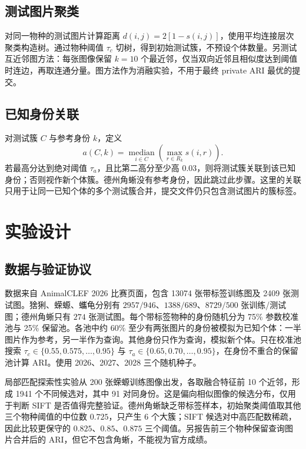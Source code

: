 \documentclass[UTF8,a4paper,10pt]{ctexart}
\begin{document}
\subsection{测试图片聚类}
对同一物种的测试图片计算距离 $d(i,j)=2[1-s(i,j)]$，使用平均连接层次聚类构造树。通过物种阈值 $\tau_c$ 切树，得到初始测试簇，不预设个体数量。另测试互近邻图方法：每张图像保留 $k=10$ 个最近邻，仅当双向近邻且相似度达到阈值时连边，再取连通分量。图方法作为消融实验，不用于最终 private ARI 最优的提交。

\subsection{已知身份关联}
对测试簇 $C$ 与参考身份 $k$，定义
\begin{equation}
 a(C,k)=\underset{i\in C}{\operatorname{median}}
 \left(\max_{r\in R_k}s(i,r)\right).
\end{equation}
若最高分达到绝对阈值 $\tau_a$，且比第二高分至少高 $0.03$，则将测试簇关联到该已知身份；否则视作新个体簇。德州角蜥没有参考身份，因此跳过此步骤。这里的关联只用于让同一已知个体的多个测试簇合并，提交文件仍只包含测试图片的簇标签。

\section{实验设计}
\subsection{数据与验证协议}
数据来自 AnimalCLEF 2026 比赛页面\cite{competition}，包含 13074 张带标签训练图及 2409 张测试图。猞猁、蝾螈、蠵龟分别有 $2957/946$、$1388/689$、$8729/500$ 张训练/测试图；德州角蜥只有 $274$ 张测试图。每个带标签物种的身份随机分为 75\% 参数校准池与 25\% 保留池。各池中约 60\% 至少有两张图片的身份被模拟为已知个体：一半图片作为参考，另一半作为查询。其他身份只作为查询，模拟新个体。只在校准池搜索 $\tau_c\in\{0.55,0.575,\ldots,0.95\}$ 与 $\tau_a\in\{0.65,0.70,\ldots,0.95\}$，在身份不重合的保留池计算 ARI。使用 2026、2027、2028 三个随机种子。

局部匹配探索性实验从 200 张蝾螈训练图像出发，各取融合特征前 10 个近邻，形成 1941 个不同候选对，其中 91 对同身份。这是偏向相似图像的候选分布，仅用于判断 SIFT 是否值得完整验证。德州角蜥缺乏带标签样本，初始聚类阈值取其他三个物种阈值的中位数 $0.725$，只产生 6 个大簇；SIFT 候选对中高匹配数稀疏，因此比较更保守的 $0.825$、$0.85$、$0.875$ 三个阈值。另报告前三个物种保留查询图片合并后的 ARI，但它不包含角蜥，不能视为官方成绩。
\end{document}
